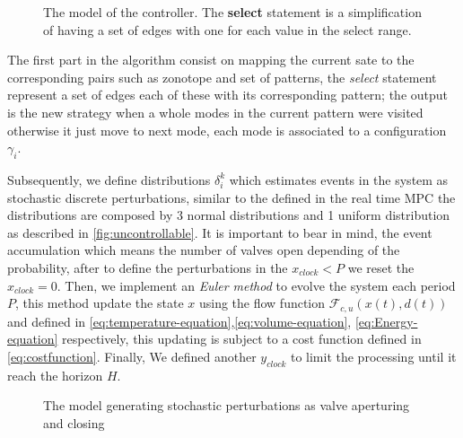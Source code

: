         \begin{figure}[!hbt]
          \centering
          
          \captionsetup{format=hang}
          \caption{The model of the controller. The \textbf{select} statement is a simplification of having a set of edges with one for each value in the select range.}          
          \label{fig:selectoperator}
        \end{figure}

        The first part in the algorithm consist on mapping the current sate to 
        the corresponding pairs such as zonotope and set of patterns, the 
        \emph{select} statement represent a set of edges each of these with its 
        corresponding pattern; the output is the new strategy when a whole modes
        in the current pattern were visited otherwise it just move to next 
        mode, each mode is associated to a configuration $\gamma_i$.

        Subsequently, we define distributions $\delta^k_i$ which estimates
        events in the system as stochastic discrete perturbations, similar to the 
        defined in the real time \ac{MPC} the distributions are composed by 
        3 normal distributions and 1 uniform distribution as described in 
        \autoref{fig:uncontrollable}. It is important to bear in mind,
        the event accumulation which means the number of valves open 
        depending of the probability, after to define the perturbations 
        in the $x_{clock}<P$ we reset the $x_{clock}=0$. Then, we implement
        an \emph{Euler method} to evolve the system each period $P$, this method
        update the state $x$ using the flow function $\mathcal{F}_{c,u}(x(t),d(t))$
        and defined in \autoref{eq:temperature-equation},\autoref{eq:volume-equation},
        \autoref{eq:Energy-equation} respectively, this updating is 
        subject to a cost function defined in \autoref{eq:costfunction}. Finally, 
        We defined another $y_{clock}$ to limit the processing 
        until it reach the horizon $H$.

      
        \begin{figure}[!hbt]
          \centering
          
          \captionsetup{format=hang}
          \caption{The model generating stochastic perturbations as valve aperturing and closing}
          \label{fig:perturbationsgeneration}
        \end{figure}
        

        \clearpage


